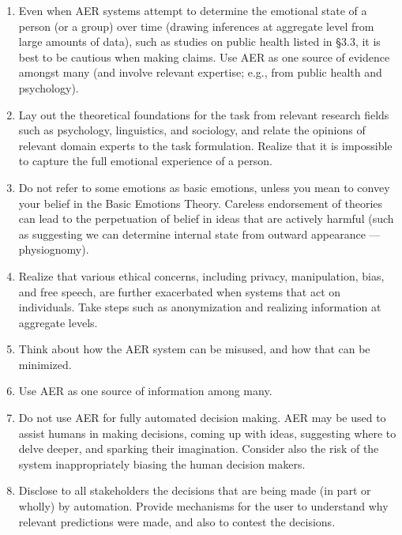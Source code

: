 \documentclass{clv3}
\begin{document}
{\begin{enumerate}
\item Even when AER systems attempt to determine the emotional state of a person (or a group) over time (drawing inferences at aggregate level from large amounts of data), such as studies on public health listed in \S3.3, it is best to be cautious when making claims. Use AER as one source of evidence amongst many (and involve relevant expertise; e.g., from public health and psychology).

\item Lay out the theoretical foundations for the task from relevant research fields such as psychology, linguistics, and sociology, and relate the opinions of relevant domain experts to the task formulation. Realize that it is impossible to capture the full emotional experience of a person.
\item Do not refer to some emotions as basic emotions, unless you mean to convey your belief in the Basic Emotions Theory. Careless endorsement of theories can lead to the perpetuation of belief in ideas that are actively harmful (such as suggesting we can determine internal state from outward appearance — physiognomy).
\item Realize that various ethical concerns, including privacy, manipulation, bias, and free speech, are further exacerbated when systems that act on individuals. Take steps such as anonymization and realizing information at aggregate levels.



\item Think about how the AER system can be misused, and how that can be minimized.
\item Use AER as one source of information among many.
\item Do not use AER for fully automated decision making. AER may be used to assist humans in making decisions, coming up with ideas, suggesting where to delve deeper, and sparking their imagination. Consider also the risk of the system inappropriately biasing the human decision makers.
\item Disclose to all stakeholders the decisions that are being made (in part or wholly) by automation. Provide mechanisms for the user to understand why relevant predictions were made, and also to contest the decisions.
\end{enumerate}

}
\end{document}
